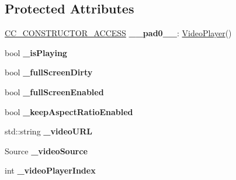 \subsection*{Protected Attributes}
\begin{DoxyCompactItemize}
\item 
\mbox{\label{classexperimental_1_1ui_1_1VideoPlayer_a8d5d6d21f4832f9f496c77534d82f143}} 
\hyperlink{_2cocos2d_2cocos_2base_2ccConfig_8h_a25ef1314f97c35a2ed3d029b0ead6da0}{C\+C\+\_\+\+C\+O\+N\+S\+T\+R\+U\+C\+T\+O\+R\+\_\+\+A\+C\+C\+E\+SS} {\bfseries \+\_\+\+\_\+pad0\+\_\+\+\_\+}\+: \hyperlink{classexperimental_1_1ui_1_1VideoPlayer}{Video\+Player}()
\item 
\mbox{\label{classexperimental_1_1ui_1_1VideoPlayer_aae6a0ce3f83c426c03fafa3a0b24e47a}} 
bool {\bfseries \+\_\+is\+Playing}
\item 
\mbox{\label{classexperimental_1_1ui_1_1VideoPlayer_a0fe23cb62cf3ed67ed6b7702f275c4ea}} 
bool {\bfseries \+\_\+full\+Screen\+Dirty}
\item 
\mbox{\label{classexperimental_1_1ui_1_1VideoPlayer_a58f8bf206941b800ea79a36370166796}} 
bool {\bfseries \+\_\+full\+Screen\+Enabled}
\item 
\mbox{\label{classexperimental_1_1ui_1_1VideoPlayer_a28522104398d581c31130e223226fd1c}} 
bool {\bfseries \+\_\+keep\+Aspect\+Ratio\+Enabled}
\item 
\mbox{\label{classexperimental_1_1ui_1_1VideoPlayer_aa5f0f92b4da15ddcd6e78b3692bd44ee}} 
std\+::string {\bfseries \+\_\+video\+U\+RL}
\item 
\mbox{\label{classexperimental_1_1ui_1_1VideoPlayer_a0ae4cf8d858edf937830f8ef5b48f6cb}} 
Source {\bfseries \+\_\+video\+Source}
\item 
\mbox{\label{classexperimental_1_1ui_1_1VideoPlayer_a8683642d113b4bac35f197e88760d195}} 
int {\bfseries \+\_\+video\+Player\+Index}

\end{DoxyCompactItemize}
